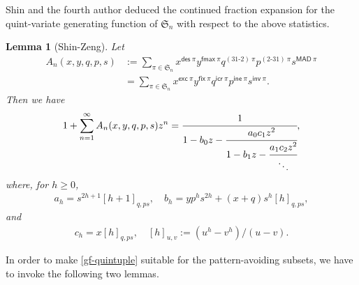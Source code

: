 \documentclass[12pt,reqno]{amsart}
\numberwithin{equation}{section}
\theoremstyle{plain}
\newtheorem{lemma}[theorem]{Lemma}
\theoremstyle{definition}
\def\S{\mathfrak{S}}
\def\exc{\mathsf{exc}}
\def\des{\mathsf{des}}
\def\inv{\mathsf{inv}}
\def\fix{\mathsf{fix}}
\def\fmax{\mathsf{fmax}}
\def\icr{\mathsf{icr}}
\def\ine{\mathsf{ine}}
\def\MAD{\mathsf{MAD}}
\def\cab{31\text{-}2}
\def\bca{2\text{-}31}
\begin{document}
Shin and the fourth author \cite{SZ10} deduced the continued fraction expansion for the quint-variate generating function of $\S_n$ with respect to the above statistics.
\begin{lemma}[Shin-Zeng]\label{Lemma:Shin-Zeng}
Let
\begin{align}\label{gf-quintuple}
A_n(x,y,q,p,s)&:=\sum_{\pi\in\S_n}x^{\des\:\pi}y^{\fmax\:\pi}q^{(\cab)\:\pi}p^{(\bca)\:\pi}s^{\MAD\:\pi}\nonumber \\
&=\sum_{\pi\in\S_n}x^{\exc\:\pi}y^{\fix\:\pi}q^{\icr\:\pi}p^{\ine\:\pi}s^{\inv\:\pi}.
\end{align}
Then we have
\begin{align}\label{cf-quintuple}
1+\sum_{n=1}^{\infty}A_n(x,y,q,p,s)z^n=\cfrac{1}{1-b_0z-\cfrac{a_0c_1z^2}{1-b_1z-\cfrac{a_1c_2z^2}{\ddots}}},
\end{align}
where, for $h\ge 0$,
\begin{align*}
a_h=s^{2h+1}[h+1]_{q,ps}, \quad b_h=yp^hs^{2h}+(x+q)s^h[h]_{q,ps},
\end{align*}
and
\begin{align*}
c_h=x[h]_{q,ps},\quad [h]_{u,v}:=(u^{h}-v^{h})/(u-v).
\end{align*}
\end{lemma}
%




 In order to make \eqref{gf-quintuple} suitable for the pattern-avoiding subsets, we have to invoke the following two lemmas.
\end{document}
